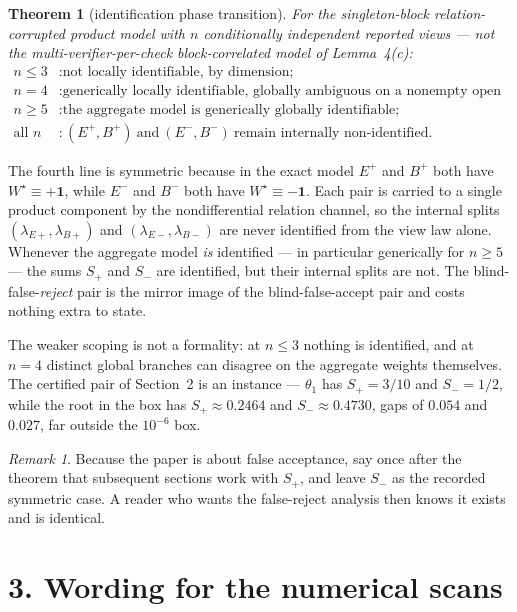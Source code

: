 \documentclass[11pt]{article}
\newtheorem{theorem}{Theorem}
\theoremstyle{remark}
\newtheorem*{remark}{Remark}
\newcommand{\one}{\mathbf{1}}
\begin{document}
\begin{theorem}[identification phase transition]
For the singleton-block relation-corrupted product model with $n$ conditionally independent reported views --- not the multi-verifier-per-check block-correlated model of Lemma~4(c):
\[
\boxed{\begin{array}{ll}
n\le3 &: \text{not locally identifiable, by dimension;}\\[1mm]
n=4 &: \text{generically locally identifiable, globally ambiguous on a nonempty open set;}\\[1mm]
n\ge5 &: \text{the aggregate model is generically globally identifiable;}\\[1mm]
\text{all }n &: (E^+,B^+)\ \text{and}\ (E^-,B^-)\ \text{remain internally non-identified.}
\end{array}}
\]
\end{theorem}

The fourth line is symmetric because in the exact model $E^+$ and $B^+$ both have $W^\star\equiv+\one$, while $E^-$ and $B^-$ both have $W^\star\equiv-\one$. Each pair is carried to a single product component by the nondifferential relation channel, so the internal splits $(\lambda_{E+},\lambda_{B+})$ and $(\lambda_{E-},\lambda_{B-})$ are never identified from the view law alone. Whenever the aggregate model \emph{is} identified --- in particular generically for $n\ge5$ --- the sums $S_+$ and $S_-$ are identified, but their internal splits are not. The blind-false-\emph{reject} pair is the mirror image of the blind-false-accept pair and costs nothing extra to state.

The weaker scoping is not a formality: at $n\le3$ nothing is identified, and at $n=4$ distinct global branches can disagree on the aggregate weights themselves. The certified pair of Section~2 is an instance --- $\theta_1$ has $S_+=3/10$ and $S_-=1/2$, while the root in the box has $S_+\approx0.2464$ and $S_-\approx0.4730$, gaps of $0.054$ and $0.027$, far outside the $10^{-6}$ box.

\begin{remark}
Because the paper is about false acceptance, say once after the theorem that subsequent sections work with $S_+$, and leave $S_-$ as the recorded symmetric case. A reader who wants the false-reject analysis then knows it exists and is identical.
\end{remark}

\section*{3. Wording for the numerical scans}
\end{document}
